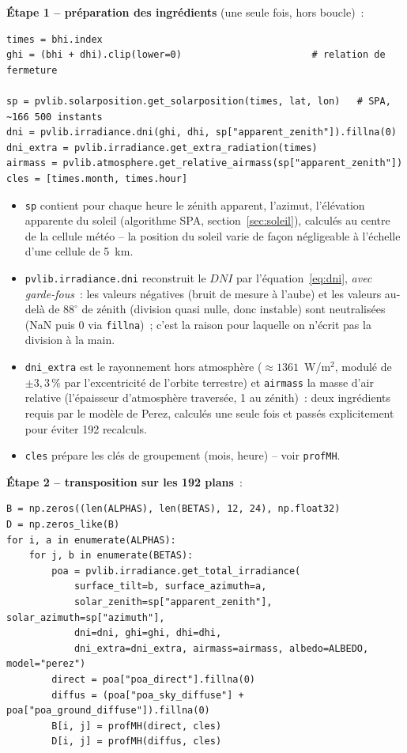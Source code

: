 \documentclass[11pt,a4paper]{article}
\newcommand{\fonction}[1]{\texttt{#1}}
\begin{document}
\textbf{Étape 1 -- préparation des ingrédients} (une seule fois, hors boucle)~:

\begin{lstlisting}
times = bhi.index
ghi = (bhi + dhi).clip(lower=0)                       # relation de fermeture

sp = pvlib.solarposition.get_solarposition(times, lat, lon)   # SPA, ~166 500 instants
dni = pvlib.irradiance.dni(ghi, dhi, sp["apparent_zenith"]).fillna(0)
dni_extra = pvlib.irradiance.get_extra_radiation(times)
airmass = pvlib.atmosphere.get_relative_airmass(sp["apparent_zenith"])
cles = [times.month, times.hour]
\end{lstlisting}

\begin{itemize}
  \item \fonction{sp} contient pour chaque heure le zénith apparent, l'azimut,
    l'élévation apparente du soleil (algorithme SPA,
    section~\ref{sec:soleil}), calculés au centre de la cellule météo -- la
    position du soleil varie de façon négligeable à l'échelle d'une cellule de
    5~km.
  \item \fonction{pvlib.irradiance.dni} reconstruit le $DNI$ par
    l'équation~\eqref{eq:dni}, \emph{avec garde-fous}~: les valeurs négatives
    (bruit de mesure à l'aube) et les valeurs au-delà de $88^\circ$ de zénith
    (division quasi nulle, donc instable) sont neutralisées (NaN puis 0 via
    \fonction{fillna})~; c'est la raison pour laquelle on n'écrit pas la
    division à la main.
  \item \fonction{dni\_extra} est le rayonnement hors atmosphère
    ($\approx 1361$~W/m$^2$, modulé de $\pm 3{,}3\,\%$ par l'excentricité de
    l'orbite terrestre) et \fonction{airmass} la masse d'air relative
    (l'épaisseur d'atmosphère traversée, 1 au zénith)~: deux ingrédients
    requis par le modèle de Perez, calculés une seule fois et passés
    explicitement pour éviter 192 recalculs.
  \item \fonction{cles} prépare les clés de groupement (mois, heure) -- voir
    \fonction{profMH}.
\end{itemize}

\textbf{Étape 2 -- transposition sur les 192 plans}~:

\begin{lstlisting}
B = np.zeros((len(ALPHAS), len(BETAS), 12, 24), np.float32)
D = np.zeros_like(B)
for i, a in enumerate(ALPHAS):
    for j, b in enumerate(BETAS):
        poa = pvlib.irradiance.get_total_irradiance(
            surface_tilt=b, surface_azimuth=a,
            solar_zenith=sp["apparent_zenith"], solar_azimuth=sp["azimuth"],
            dni=dni, ghi=ghi, dhi=dhi,
            dni_extra=dni_extra, airmass=airmass, albedo=ALBEDO, model="perez")
        direct = poa["poa_direct"].fillna(0)
        diffus = (poa["poa_sky_diffuse"] + poa["poa_ground_diffuse"]).fillna(0)
        B[i, j] = profMH(direct, cles)
        D[i, j] = profMH(diffus, cles)
\end{lstlisting}
\end{document}
